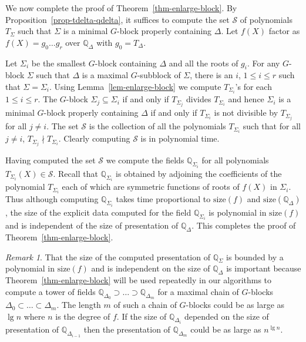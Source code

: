 \documentclass[11pt]{madras}%
\theoremstyle{remark}
\newtheorem{remark}[theorem]{Remark}
\newcommand{\size}[1]{{\ensuremath{\mathrm{size}\left(#1\right)}}}
\begin{document}
We now complete the proof of Theorem~\ref{thm-enlarge-block}.  By
Proposition~\ref{prop-tdelta-qdelta}, it suffices to compute the set
$\mathcal{S}$ of polynomials $T_\Sigma$ such that $\Sigma$ is a
minimal $G$-block properly containing $\Delta$. Let $f(X)$ factor as
$f(X) = g_0\ldots g_r$ over $\mathbb{Q}_\Delta$ with $g_0 = T_\Delta$.

Let $\Sigma_i$ be the smallest $G$-block containing $\Delta$ and all
the roots of $g_i$. For any $G$-block $\Sigma$ such that $\Delta$ is a
maximal $G$-subblock of $\Sigma$, there is an $i$, $1 \leq i \leq r$
such that $\Sigma = \Sigma_i$. Using Lemma~\ref{lem-enlarge-block} we
compute $T_{\Sigma_i}$'s for each $1 \leq i \leq r$.  The $G$-block
$\Sigma_j \subseteq \Sigma_i$ if and only if $T_{\Sigma_j}$ divides
$T_{\Sigma_i}$ and hence $\Sigma_i$ is a minimal $G$-block properly
containing $\Delta$ if and only if $T_{\Sigma_i}$ is not divisible by
$T_{\Sigma_j}$ for all $j \neq i$.  The set $\mathcal{S}$ is the
collection of all the polynomials $T_{\Sigma_i}$ such that for all $j
\neq i$, $T_{\Sigma_j} \nmid T_{\Sigma_i}$.  Clearly computing
$\mathcal{S}$ is in polynomial time.

Having computed the set $\mathcal{S}$ we compute the fields
$\mathbb{Q}_{\Sigma_i}$ for all polynomials $T_{\Sigma_i}(X) \in
\mathcal{S}$. Recall that $\mathbb{Q}_{\Sigma_i}$ is obtained by
adjoining the coefficients of the polynomial $T_{\Sigma_i}$ each of
which are symmetric functions of roots of $f(X)$ in $\Sigma_i$. Thus
although computing $\mathbb{Q}_{\Sigma_i}$ takes time proportional to
$\size{f}$ and $\size{\mathbb{Q}_\Delta}$, the size of the explicit
data computed for the field $\mathbb{Q}_{\Sigma_i}$ is polynomial in
$\size{f}$ and is independent of the size of presentation of
$\mathbb{Q}_\Delta$. This completes the proof of
Theorem~\ref{thm-enlarge-block}.

\begin{remark}
  That the size of the computed presentation of $\mathbb{Q}_\Sigma$ is
  bounded by a polynomial in $\size{f}$ and is independent on the size
  of $\mathbb{Q}_\Delta$ is important because
  Theorem~\ref{thm-enlarge-block} will be used repeatedly in our
  algorithms to compute a tower of fields
  $\mathbb{Q}_{\Delta_0}\supset \ldots \supset \mathbb{Q}_{\Delta_m}$
  for a maximal chain of $G$-blocks $\Delta_0 \subset \ldots \subset
  \Delta_m$. The length $m$ of such a chain of $G$-blocks could be as
  large as $\lg{n}$ where $n$ is the degree of $f$. If the size of
  $\mathbb{Q}_{\Delta_i}$ depended on the size of presentation of
  $\mathbb{Q}_{\Delta_{i-1}}$ then the presentation of
  $\mathbb{Q}_{\Delta_m}$ could be as large as $n^{\lg n}$.

\end{remark}
\end{document}
